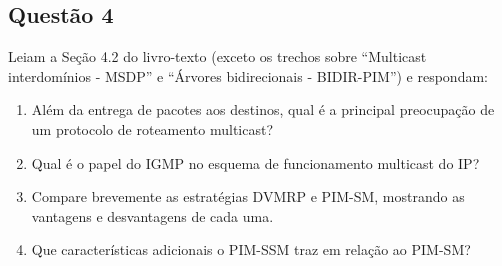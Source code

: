 \subsection{Questão 4}
Leiam a Seção 4.2 do livro-texto (exceto os trechos sobre “Multicast
interdomínios - MSDP” e “Árvores bidirecionais - BIDIR-PIM”) e respondam:

\begin{enumerate}[label=\alph*.]
    \item Além da entrega de pacotes aos destinos, qual é a principal preocupação de um
    protocolo de roteamento multicast?
    \item Qual é o papel do IGMP no esquema de funcionamento multicast do IP?
    \item Compare brevemente as estratégias DVMRP e PIM-SM, mostrando as vantagens e
    desvantagens de cada uma.
    \item Que características adicionais o PIM-SSM traz em relação ao PIM-SM?
\end{enumerate}
